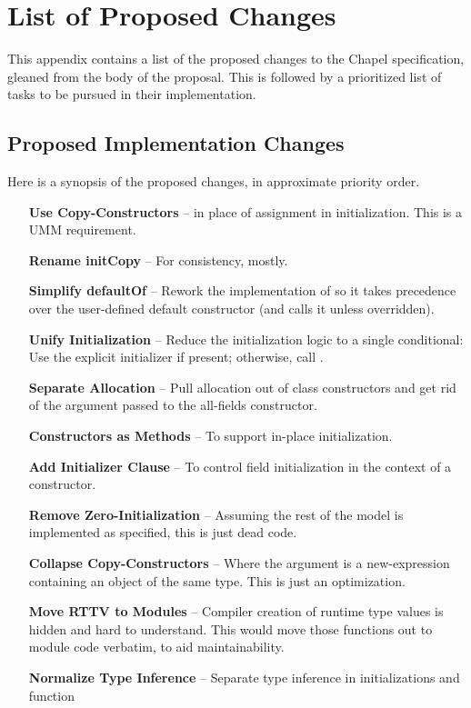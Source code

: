 \section{List of Proposed Changes}
\label{Changes}

This appendix contains a list of the proposed changes to the Chapel specification,
gleaned from the body of the proposal.  This is followed by a prioritized list of tasks to
be pursued in their implementation.

\subsection{Proposed Implementation Changes}
Here is a synopsis of the proposed changes, in approximate priority order.
\begin{itemize}[leftmargin=2.5cm]
\item[\bf Use Copy-Constructors] -- in place of assignment in initialization.  This is a UMM requirement.
\item[\bf Rename initCopy] -- For consistency, mostly.
\item[\bf Simplify defaultOf] -- Rework the implementation of  so it takes
  precedence over the user-defined default constructor (and calls it unless overridden).
\item[\bf Unify Initialization] -- Reduce the initialization logic to a single conditional:
  Use the explicit initializer if present; otherwise, call .
\item[\bf Separate Allocation] -- Pull allocation out of class constructors and get rid of the
   argument passed to the all-fields constructor.
\item[\bf Constructors as Methods] -- To support in-place initialization.
\item[\bf Add Initializer Clause] -- To control field initialization in the context of a
  constructor.
\item[\bf Remove Zero-Initialization] -- Assuming the rest of the model is implemented as
  specified, this is just dead code.
\item[\bf Collapse Copy-Constructors] -- Where the argument is a new-expression containing
  an object of the same type.  This is just an optimization.
\item[\bf Move RTTV to Modules] -- Compiler creation of runtime type values is hidden and hard
  to understand.  This would move those functions out to module code verbatim, to aid
  maintainability.
\item[\bf Normalize Type Inference] -- Separate type inference in initializations and function

\end{itemize}
